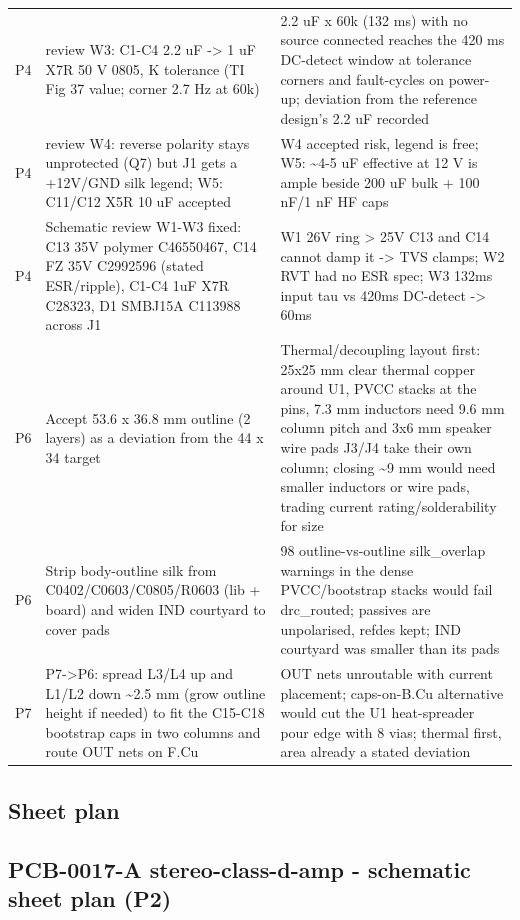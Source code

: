 \documentclass[11pt,a4paper]{article}
\begin{document}
{\begin{longtable}{lp{5.2cm}p{7.2cm}}
P4 & review W3: C1-C4 2.2 uF -\textgreater{} 1 uF X7R 50 V 0805, K tolerance (TI Fig 37 value; corner 2.7 Hz at 60k) & 2.2 uF x 60k (132 ms) with no source connected reaches the 420 ms DC-detect window at tolerance corners and fault-cycles on power-up; deviation from the reference design's 2.2 uF recorded \\
P4 & review W4: reverse polarity stays unprotected (Q7) but J1 gets a +12V/GND silk legend; W5: C11/C12 X5R 10 uF accepted & W4 accepted risk, legend is free; W5: \textasciitilde{}4-5 uF effective at 12 V is ample beside 200 uF bulk + 100 nF/1 nF HF caps \\
P4 & Schematic review W1-W3 fixed: C13 35V polymer C46550467, C14 FZ 35V C2992596 (stated ESR/ripple), C1-C4 1uF X7R C28323, D1 SMBJ15A C113988 across J1 & W1 26V ring \textgreater{} 25V C13 and C14 cannot damp it -\textgreater{} TVS clamps; W2 RVT had no ESR spec; W3 132ms input tau vs 420ms DC-detect -\textgreater{} 60ms \\
P6 & Accept 53.6 x 36.8 mm outline (2 layers) as a deviation from the 44 x 34 target & Thermal/decoupling layout first: 25x25 mm clear thermal copper around U1, PVCC stacks at the pins, 7.3 mm inductors need 9.6 mm column pitch and 3x6 mm speaker wire pads J3/J4 take their own column; closing \textasciitilde{}9 mm would need smaller inductors or wire pads, trading current rating/solderability for size \\
P6 & Strip body-outline silk from C0402/C0603/C0805/R0603 (lib + board) and widen IND courtyard to cover pads & 98 outline-vs-outline silk\_overlap warnings in the dense PVCC/bootstrap stacks would fail drc\_routed; passives are unpolarised, refdes kept; IND courtyard was smaller than its pads \\
P7 & P7-\textgreater{}P6: spread L3/L4 up and L1/L2 down \textasciitilde{}2.5 mm (grow outline height if needed) to fit the C15-C18 bootstrap caps in two columns and route OUT nets on F.Cu & OUT nets unroutable with current placement; caps-on-B.Cu alternative would cut the U1 heat-spreader pour edge with 8 vias; thermal first, area already a stated deviation \\
\bottomrule
\end{longtable}
}
\subsection*{Sheet plan}
\subsection*{PCB-0017-A stereo-class-d-amp - schematic sheet plan (P2)}
\end{document}
